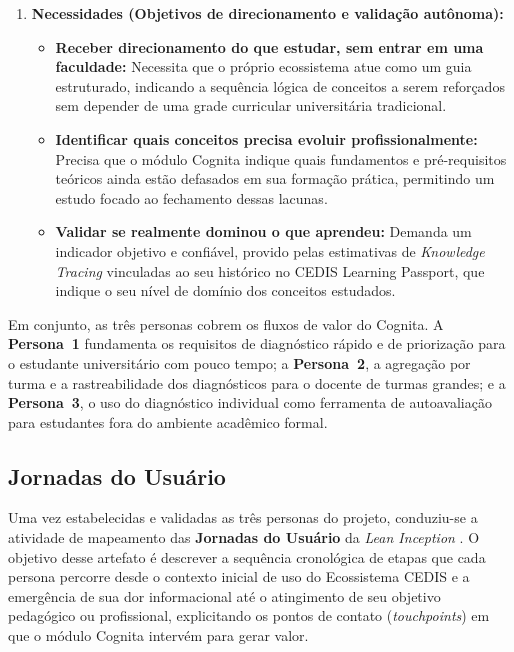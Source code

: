 \begin{enumerate}
    \item \textbf{Necessidades (Objetivos de direcionamento e validação autônoma):}
    \begin{itemize}
        \item \textbf{Receber direcionamento do que estudar, sem entrar em uma faculdade:} Necessita que o próprio ecossistema atue como um guia estruturado, indicando a sequência lógica de conceitos a serem reforçados sem depender de uma grade curricular universitária tradicional.
        \item \textbf{Identificar quais conceitos precisa evoluir profissionalmente:} Precisa que o módulo Cognita indique quais fundamentos e pré-requisitos teóricos ainda estão defasados em sua formação prática, permitindo um estudo focado ao fechamento dessas lacunas.
        \item \textbf{Validar se realmente dominou o que aprendeu:} Demanda um indicador objetivo e confiável, provido pelas estimativas de \textit{Knowledge Tracing} vinculadas ao seu histórico no CEDIS Learning Passport, que indique o seu nível de domínio dos conceitos estudados.
    \end{itemize}
\end{enumerate}

Em conjunto, as três personas cobrem os fluxos de valor do Cognita. A \textbf{Persona~1} fundamenta os requisitos de diagnóstico rápido e de priorização para o estudante universitário com pouco tempo; a \textbf{Persona~2}, a agregação por turma e a rastreabilidade dos diagnósticos para o docente de turmas grandes; e a \textbf{Persona~3}, o uso do diagnóstico individual como ferramenta de autoavaliação para estudantes fora do ambiente acadêmico formal.

\subsection{Jornadas do Usuário}
\label{subsec:jornadas-usuario}

Uma vez estabelecidas e validadas as três personas do projeto, conduziu-se a atividade de mapeamento das \textbf{Jornadas do Usuário} da \textit{Lean Inception} \cite{caroli_lean_2018}. O objetivo desse artefato é descrever a sequência cronológica de etapas que cada persona percorre desde o contexto inicial de uso do Ecossistema CEDIS e a emergência de sua dor informacional até o atingimento de seu objetivo pedagógico ou profissional, explicitando os pontos de contato (\textit{touchpoints}) em que o módulo Cognita intervém para gerar valor.


